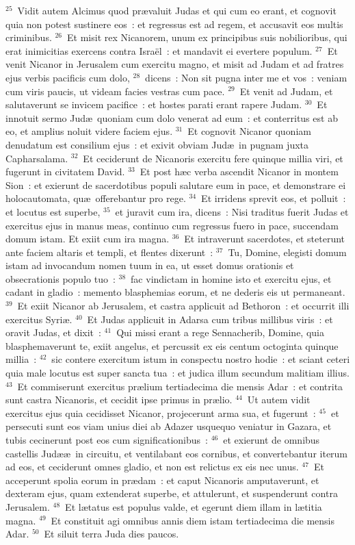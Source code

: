 ${}^{25}$~Vidit autem Alcimus quod pr\ae valuit Judas et qui cum eo erant, et cognovit quia non potest sustinere eos~: et regressus est ad regem, et accusavit eos multis criminibus.
${}^{26}$~Et misit rex Nicanorem, unum ex principibus suis nobilioribus, qui erat inimicitias exercens contra Isra\"el~: et mandavit ei evertere populum.
${}^{27}$~Et venit Nicanor in Jerusalem cum exercitu magno, et misit ad Judam et ad fratres ejus verbis pacificis cum dolo,
${}^{28}$~dicens~: Non sit pugna inter me et vos~: veniam cum viris paucis, ut videam facies vestras cum pace.
${}^{29}$~Et venit ad Judam, et salutaverunt se invicem pacifice~: et hostes parati erant rapere Judam.
${}^{30}$~Et innotuit sermo Jud\ae\ quoniam cum dolo venerat ad eum~: et conterritus est ab eo, et amplius noluit videre faciem ejus.
${}^{31}$~Et cognovit Nicanor quoniam denudatum est consilium ejus~: et exivit obviam Jud\ae\ in pugnam juxta Capharsalama.
${}^{32}$~Et ceciderunt de Nicanoris exercitu fere quinque millia viri, et fugerunt in civitatem David.
${}^{33}$~Et post h\ae c verba ascendit Nicanor in montem Sion~: et exierunt de sacerdotibus populi salutare eum in pace, et demonstrare ei holocautomata, qu\ae\ offerebantur pro rege.
${}^{34}$~Et irridens sprevit eos, et polluit~: et locutus est superbe,
${}^{35}$~et juravit cum ira, dicens~: Nisi traditus fuerit Judas et exercitus ejus in manus meas, continuo cum regressus fuero in pace, succendam domum istam. Et exiit cum ira magna.
${}^{36}$~Et intraverunt sacerdotes, et steterunt ante faciem altaris et templi, et flentes dixerunt~:
${}^{37}$~Tu, Domine, elegisti domum istam ad invocandum nomen tuum in ea, ut esset domus orationis et obsecrationis populo tuo~:
${}^{38}$~fac vindictam in homine isto et exercitu ejus, et cadant in gladio~: memento blasphemias eorum, et ne dederis eis ut permaneant.
${}^{39}$~Et exiit Nicanor ab Jerusalem, et castra applicuit ad Bethoron~: et occurrit illi exercitus Syri\ae .
${}^{40}$~Et Judas applicuit in Adarsa cum tribus millibus viris~: et oravit Judas, et dixit~:
${}^{41}$~Qui missi erant a rege Sennacherib, Domine, quia blasphemaverunt te, exiit angelus, et percussit ex eis centum octoginta quinque millia~:
${}^{42}$~sic contere exercitum istum in conspectu nostro hodie~: et sciant ceteri quia male locutus est super sancta tua~: et judica illum secundum malitiam illius.
${}^{43}$~Et commiserunt exercitus pr\ae lium tertiadecima die mensis Adar~: et contrita sunt castra Nicanoris, et cecidit ipse primus in pr\ae lio.
${}^{44}$~Ut autem vidit exercitus ejus quia cecidisset Nicanor, projecerunt arma sua, et fugerunt~:
${}^{45}$~et persecuti sunt eos viam unius diei ab Adazer usquequo veniatur in Gazara, et tubis cecinerunt post eos cum significationibus~:
${}^{46}$~et exierunt de omnibus castellis Jud\ae \ae\ in circuitu, et ventilabant eos cornibus, et convertebantur iterum ad eos, et ceciderunt omnes gladio, et non est relictus ex eis nec unus.
${}^{47}$~Et acceperunt spolia eorum in pr\ae dam~: et caput Nicanoris amputaverunt, et dexteram ejus, quam extenderat superbe, et attulerunt, et suspenderunt contra Jerusalem.
${}^{48}$~Et l\ae tatus est populus valde, et egerunt diem illam in l\ae titia magna.
${}^{49}$~Et constituit agi omnibus annis diem istam tertiadecima die mensis Adar.
${}^{50}$~Et siluit terra Juda dies paucos.

